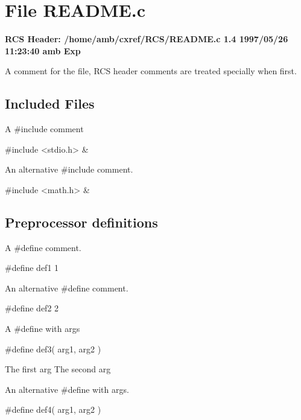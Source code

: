 
\section{File README.c}
\label{file_README.c}

{\bf RCS Header: /home/amb/cxref/RCS/README.c 1.4 1997/05/26 11:23:40 amb Exp }

\smallskip

  A comment for the file, RCS header comments are treated specially when first.

\subsection*{Included Files}

 A \#include comment

\smallskip
\begin{cxreftabi}
{\stt \#include <stdio.h>} &\\
\end{cxreftabi}

\medskip
 An alternative \#include comment.

\smallskip
\begin{cxreftabi}
{\stt \#include <math.h>} &\\
\end{cxreftabi}

\subsection*{Preprocessor definitions}

 A \#define comment.

\smallskip
{\stt \#define def1 1}

\medskip
 An alternative \#define comment.

\smallskip
{\stt \#define def2 2}

\medskip
  A \#define with args

\smallskip
{\stt \#define def3( arg1, arg2 )}

\smallskip
\begin{cxrefarglist}
 The first arg
 The second arg
\end{cxrefarglist}

\medskip
 An alternative \#define with args.

\smallskip
{\stt \#define def4( arg1, arg2 )}

